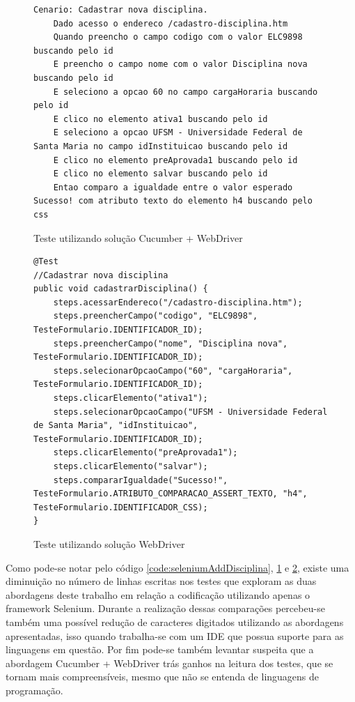 \documentclass[tg]{mdtufsm}
\begin{document}
\begin{figure}[!htt]
	\begin{lstlisting}
Cenario: Cadastrar nova disciplina.
    Dado acesso o endereco /cadastro-disciplina.htm
    Quando preencho o campo codigo com o valor ELC9898 buscando pelo id
    E preencho o campo nome com o valor Disciplina nova buscando pelo id
    E seleciono a opcao 60 no campo cargaHoraria buscando pelo id
    E clico no elemento ativa1 buscando pelo id
    E seleciono a opcao UFSM - Universidade Federal de Santa Maria no campo idInstituicao buscando pelo id
    E clico no elemento preAprovada1 buscando pelo id
    E clico no elemento salvar buscando pelo id
    Entao comparo a igualdade entre o valor esperado Sucesso! com atributo texto do elemento h4 buscando pelo css
	\end{lstlisting}
	\caption{Teste utilizando solução Cucumber + WebDriver}
	\label{code:solucao2AddDisciplina}
\end{figure}

\begin{figure}[!htt]
	\begin{lstlisting}
@Test
//Cadastrar nova disciplina
public void cadastrarDisciplina() {
    steps.acessarEndereco("/cadastro-disciplina.htm");
    steps.preencherCampo("codigo", "ELC9898", TesteFormulario.IDENTIFICADOR_ID);
    steps.preencherCampo("nome", "Disciplina nova", TesteFormulario.IDENTIFICADOR_ID);
    steps.selecionarOpcaoCampo("60", "cargaHoraria", TesteFormulario.IDENTIFICADOR_ID);
    steps.clicarElemento("ativa1");
    steps.selecionarOpcaoCampo("UFSM - Universidade Federal de Santa Maria", "idInstituicao", TesteFormulario.IDENTIFICADOR_ID);
    steps.clicarElemento("preAprovada1");
    steps.clicarElemento("salvar");
    steps.compararIgualdade("Sucesso!", TesteFormulario.ATRIBUTO_COMPARACAO_ASSERT_TEXTO, "h4", TesteFormulario.IDENTIFICADOR_CSS);
}
	\end{lstlisting}
	\caption{Teste utilizando solução WebDriver}
	\label{code:solucao3AddDisciplina}
\end{figure}

Como pode-se notar pelo código \ref{code:seleniumAddDisciplina}, \ref{code:solucao2AddDisciplina} e \ref{code:solucao3AddDisciplina}, existe uma diminuição no número de linhas escritas nos testes que exploram as duas abordagens deste trabalho em relação a codificação utilizando apenas o framework Selenium. Durante a realização dessas comparações percebeu-se também uma possível redução de caracteres digitados utilizando as abordagens apresentadas, isso quando trabalha-se com um IDE que possua suporte para as linguagens em questão. Por fim pode-se também levantar suspeita que a abordagem Cucumber + WebDriver trás ganhos na leitura dos testes, que se tornam mais compreensíveis, mesmo que não se entenda de linguagens de programação.
\end{document}
